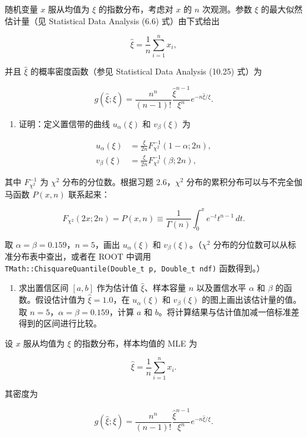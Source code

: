 \begin{question}
随机变量 \(x\) 服从均值为 \(\xi\) 的指数分布，考虑对 \(x\) 的 \(n\)
次观测。参数 \(\xi\) 的最大似然估计量（见 Statistical Data Analysis
(6.6) 式）由下式给出

\[
\hat\xi=\frac1n\sum_{i=1}^{n}x_i,
\]

并且 \(\hat\xi\) 的概率密度函数（参见 Statistical Data Analysis (10.25)
式）为

\[
g(\hat\xi;\xi)=\frac{n^n}{(n-1)!}\frac{\hat\xi^{n-1}}{\xi^n}e^{-n\hat\xi/\xi}.
\]

\begin{enumerate}
\item
  证明：定义置信带的曲线 \(u_\alpha(\xi)\) 和 \(v_\beta(\xi)\) 为
\end{enumerate}

\[
\begin{split}
u_\alpha(\xi)&=\frac{\xi}{2n}F_{\chi^2}^{-1}(1-\alpha;2n),\\
v_\beta(\xi)&=\frac{\xi}{2n}F_{\chi^2}^{-1}(\beta;2n),
\end{split}
\]

其中 \(F_{\chi^2}^{-1}\) 为 \(\chi^2\) 分布的分位数。根据习题
2.6，\(\chi^2\) 分布的累积分布可以与不完全伽马函数 \(P(x,n)\) 联系起来：

\[
F_{\chi^2}(2x;2n)=P(x,n)\equiv\frac1{\Gamma(n)}\int_0^x e^{-t}t^{n-1}\,dt.
\]

取 \(\alpha=\beta=0.159\)，\(n=5\)，画出 \(u_\alpha(\xi)\) 和
\(v_\beta(\xi)\)。（\(\chi^2\)
分布的分位数可以从标准分布表中查出，或者在 ROOT 中调用
\texttt{TMath::ChisquareQuantile(Double\_t\ p,\ Double\_t\ ndf)}
函数得到。）

\begin{enumerate}[start=2]
\item
  求出置信区间 \([a,b]\) 作为估计值 \(\hat\xi\)、样本容量 \(n\)
  以及置信水平 \(\alpha\) 和 \(\beta\) 的函数。假设估计值为
  \(\hat\xi=1.0\)，在 \(u_\alpha(\xi)\) 和 \(v_\beta(\xi)\)
  的图上画出该估计量的值。取 \(n=5\)，\(\alpha=\beta=0.159\)，计算 \(a\)
  和 \(b\)。将计算结果与估计值加减一倍标准差得到的区间进行比较。
\end{enumerate}
\begin{solution}
设 \(x\) 服从均值为 \(\xi\) 的指数分布，样本均值的 MLE 为

\[
\hat\xi=\frac1n\sum_{i=1}^n x_i.
\]

其密度为

\[
g(\hat\xi;\xi)=\frac{n^n}{(n-1)!}\frac{\hat\xi^{n-1}}{\xi^n}e^{-n\hat\xi/\xi}.
\]


\end{solution}
\end{question}
